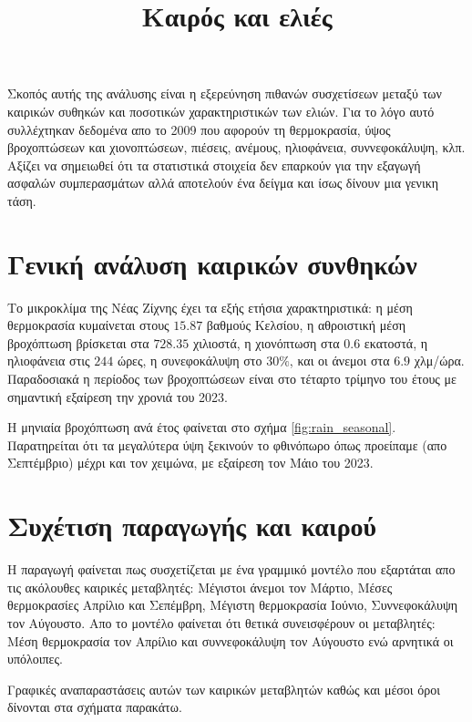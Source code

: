 \documentclass[12pt,a4paper]{article}
\title{Καιρός και ελιές}
\begin{document}
\maketitle
Σκοπός αυτής της ανάλυσης είναι η εξερεύνηση πιθανών συσχετίσεων μεταξύ των καιρικών συθηκών και ποσοτικών χαρακτηριστικών των ελιών. Για το λόγο αυτό συλλέχτηκαν δεδομένα απο το 2009 που αφορούν τη θερμοκρασία, ύψος βροχοπτώσεων και χιονοπτώσεων, πιέσεις, ανέμους, ηλιοφάνεια, συννεφοκάλυψη, κλπ. Αξίζει να σημειωθεί ότι τα στατιστικά στοιχεία δεν επαρκούν για την εξαγωγή ασφαλών συμπερασμάτων αλλά αποτελούν ένα δείγμα και ίσως δίνουν μια γενικη τάση.	
\section{Γενική ανάλυση καιρικών συνθηκών}
Το μικροκλίμα της Νέας Ζίχνης έχει τα εξής ετήσια χαρακτηριστικά: η μέση θερμοκρασία κυμαίνεται στους $15.87$ βαθμούς Κελσίου, η αθροιστική μέση βροχόπτωση βρίσκεται στα $728.35$ χιλιοστά, η χιονόπτωση στα $0.6$ εκατοστά, η ηλιοφάνεια στις $244$ ώρες, η συνεφοκάλυψη στο $30\%$, και οι άνεμοι στα $6.9$ χλμ/ώρα. Παραδοσιακά η περίοδος των βροχοπτώσεων είναι στο τέταρτο τρίμηνο του έτους με σημαντική εξαίρεση την χρονιά του 2023.%

H μηνιαία βροχόπτωση ανά έτος φαίνεται στο σχήμα \ref{fig:rain_seasonal}. Παρατηρείται ότι τα μεγαλύτερα ύψη ξεκινούν το φθινόπωρο όπως προείπαμε (απο Σεπτέμβριο) μέχρι και τον χειμώνα, με εξαίρεση τον Μάιο του 2023.

\section{Συχέτιση παραγωγής και καιρού}
Η παραγωγή φαίνεται πως συσχετίζεται με ένα γραμμικό μοντέλο που εξαρτάται απο τις ακόλουθες καιρικές μεταβλητές: Μέγιστοι άνεμοι τον Μάρτιο, Μέσες θερμοκρασίες Απρίλιο και Σεπέμβρη, Μέγιστη θερμοκρασία Ιούνιο, Συννεφοκάλυψη τον Αύγουστο. Απο το μοντέλο φαίνεται ότι θετικά συνεισφέρουν οι μεταβλητές: Μέση θερμοκρασία τον Απρίλιο και συννεφοκάλυψη τον Αύγουστο ενώ αρνητικά οι υπόλοιπες. 

Γραφικές αναπαραστάσεις αυτών των καιρικών μεταβλητών καθώς και μέσοι όροι δίνονται στα σχήματα παρακάτω. 
\end{document}
